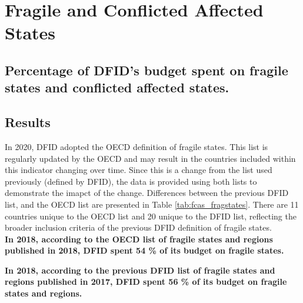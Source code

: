 \chapter{Fragile and Conflicted Affected States}

\section*{Percentage of DFID's budget spent on fragile states and conflicted affected states.}

\bigskip
\bigskip

\thispagestyle{empty}


\section{Results}

In 2020, DFID adopted the OECD definition of fragile states. %
This list is regularly updated by the OECD and may result in the countries included within this indicator changing over time. %
Since this is a change from the list used previously (defined by DFID), the data is provided using both lists to demonstrate the imapct of the change. %
Differences between the previous DFID list, and the OECD list are presented in Table \ref{tab:fcas_fragstates}. %
There are 11 countries unique to the OECD list and 20 unique to the DFID list, reflecting the broader inclusion criteria of the previous DFID definition of fragile states. \\ %

\noindent\textbf{In 2018\footnotemark, according to the OECD list of fragile states and regions published in 2018, DFID spent 54 \% of its budget on fragile states.} \\ %


\noindent\textbf{In 2018, according to the previous DFID list of fragile states and regions published in 2017, DFID spent 56 \% of its budget on fragile states and regions.} \\ %






